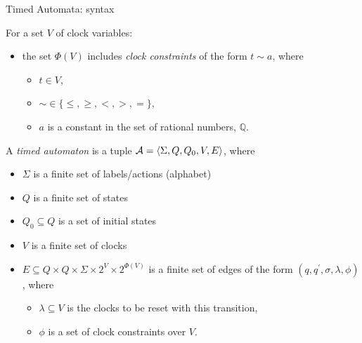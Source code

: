 \documentclass[10pt]{beamer}
\theoremstyle{plain}
\theoremstyle{definition}
\begin{document}

\begin{frame}{Timed Automata: syntax}
	\begin{block}{}
		For a set $V$ of clock variables:
		\begin{itemize}
		\item
		the set $\Phi(V)$ includes \emph{clock constraints} of the form $t\sim a$, where 
			\begin{itemize}
				\item
				$t\in V$, 
				\item
				$\sim\in\{\leq, \geq, <, >, =\}$, 
				\item
				$a$ is a constant in the set of rational numbers, $\mathbb{Q}$.
			\end{itemize}
		\end{itemize}
	\end{block}
	A \emph{timed automaton} is a tuple ${\cal A} = \langle \Sigma, Q, Q_0, V, E \rangle$, where
	\begin{itemize}
		\item $\Sigma$  is a finite set of labels/actions (alphabet)
		\item $Q$ is a finite set of states
		\item $Q_0 \subseteq Q$ is a set of initial states
		\item $V$ is a finite set of clocks
		\item $E \subseteq Q \times Q \times \Sigma \times 2^{V} \times 2^{\Phi(V)}$ is a finite set of edges of the form $(q, q^\prime, \sigma, \lambda, \phi)$, where 
			\begin{itemize}
			\item
			$\lambda \subseteq V$ is the clocks to be reset with this transition, 
			\item
			$\phi$ is a set of clock constraints over $V$.
			\end{itemize}
	\end{itemize}
\end{frame}

\end{document}
